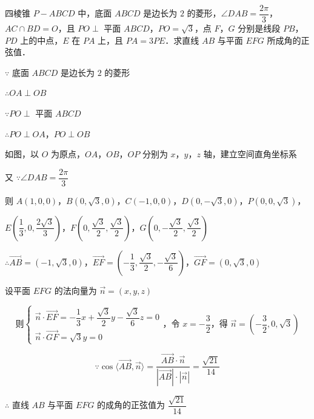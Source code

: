 \begin{example}[\bkstar{3}{5}]
四棱锥 $P-ABCD$ 中，底面 $ABCD$ 是边长为 $2$ 的菱形，$\angle DAB=\dfrac{2\pi}{3}$，$AC\cap BD=O$，且 $PO\perp$ 平面 $ABCD$，$PO=\sqrt{3}$，点 $F$，$G$ 分别是线段 $PB$，$PD$ 上的中点，$E$ 在 $PA$ 上，且 $PA=3PE$．求直线 $AB$ 与平面 $EFG$ 所成角的正弦值．
\end{example}
\begin{solution}
$\because$ 底面 $ABCD$ 是边长为 $2$ 的菱形

$\therefore OA\perp OB$

$\because PO\perp$ 平面 $ABCD$

$\therefore PO\perp OA$，$PO\perp OB$

如图，以 $O$ 为原点，$OA$，$OB$，$OP$ 分别为 $x$，$y$，$z$ 轴，建立空间直角坐标系

又 $\because \angle DAB=\dfrac{2\pi}{3}$

则 $A(1,0,0)$，$B\left(0,\sqrt{3},0\right)$，$C(-1,0,0)$，$D\left(0,-\sqrt{3},0\right)$，$P\left(0,0,\sqrt{3}\right)$，

$E\left(\dfrac{1}{3},0,\dfrac{2\sqrt{3}}{3}\right)$，$F\left(0,\dfrac{\sqrt{3}}{2},\dfrac{\sqrt{3}}{2}\right)$，$G\left(0,-\dfrac{\sqrt{3}}{2},\dfrac{\sqrt{3}}{2}\right)$

$\therefore \overrightarrow{AB}=\left(-1,\sqrt{3},0\right)$，$\overrightarrow{EF}=\left(-\dfrac{1}{3},\dfrac{\sqrt{3}}{2},-\dfrac{\sqrt{3}}{6}\right)$，$\overrightarrow{GF}=\left(0,\sqrt{3},0\right)$

设平面 $EFG$ 的法向量为 $\overrightarrow{n}=(x,y,z)$

$$
\text{则}\left\{\begin{array}{l}
\overrightarrow{n}\cdot\overrightarrow{EF}=-\dfrac{1}{3}x+\dfrac{\sqrt{3}}{2}y-\dfrac{\sqrt{3}}{6}z=0\\
\overrightarrow{n}\cdot\overrightarrow{GF}=\sqrt{3}y=0
\end{array}\right.\text{，令 }x=-\dfrac{3}{2}\text{，得 }\overrightarrow{n}=\left(-\dfrac{3}{2},0,\sqrt{3}\right)
$$

$$
\because \cos\langle\overrightarrow{AB},\overrightarrow{n}\rangle=\dfrac{\overrightarrow{AB}\cdot\overrightarrow{n}}{\left|\overrightarrow{AB}\right|\cdot\left|\overrightarrow{n}\right|}=\dfrac{\sqrt{21}}{14}
$$

$\therefore$ 直线 $AB$ 与平面 $EFG$ 的成角的正弦值为 $\dfrac{\sqrt{21}}{14}$
\end{solution}


